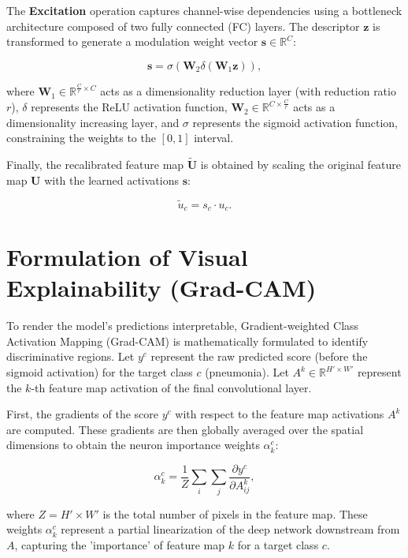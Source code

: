 \documentclass[12pt,a4paper]{report}
\begin{document}
The \textbf{Excitation} operation captures channel-wise dependencies using a bottleneck architecture composed of two fully connected (FC) layers. The descriptor $\mathbf{z}$ is transformed to generate a modulation weight vector $\mathbf{s} \in \mathbb{R}^C$:

\begin{equation}
\mathbf{s} = \sigma\left( \mathbf{W}_2 \delta( \mathbf{W}_1 \mathbf{z} ) \right),
\end{equation}

where $\mathbf{W}_1 \in \mathbb{R}^{\frac{C}{r} \times C}$ acts as a dimensionality reduction layer (with reduction ratio $r$), $\delta$ represents the ReLU activation function, $\mathbf{W}_2 \in \mathbb{R}^{C \times \frac{C}{r}}$ acts as a dimensionality increasing layer, and $\sigma$ represents the sigmoid activation function, constraining the weights to the $[0, 1]$ interval.

Finally, the recalibrated feature map $\widetilde{\mathbf{U}}$ is obtained by scaling the original feature map $\mathbf{U}$ with the learned activations $\mathbf{s}$:

\begin{equation}
\tilde{u}_c = s_c \cdot u_c.
\end{equation}

\section{Formulation of Visual Explainability (Grad-CAM)}

To render the model's predictions interpretable, Gradient-weighted Class Activation Mapping (Grad-CAM) is mathematically formulated to identify discriminative regions. Let $y^c$ represent the raw predicted score (before the sigmoid activation) for the target class $c$ (pneumonia). Let $A^k \in \mathbb{R}^{H' \times W'}$ represent the $k$-th feature map activation of the final convolutional layer.

First, the gradients of the score $y^c$ with respect to the feature map activations $A^k$ are computed. These gradients are then globally averaged over the spatial dimensions to obtain the neuron importance weights $\alpha_k^c$:

\begin{equation}
\alpha_k^c = \frac{1}{Z} \sum_{i} \sum_{j} \frac{\partial y^c}{\partial A_{ij}^k},
\end{equation}

where $Z = H' \times W'$ is the total number of pixels in the feature map. These weights $\alpha_k^c$ represent a partial linearization of the deep network downstream from $A$, capturing the 'importance' of feature map $k$ for a target class $c$.
\end{document}
